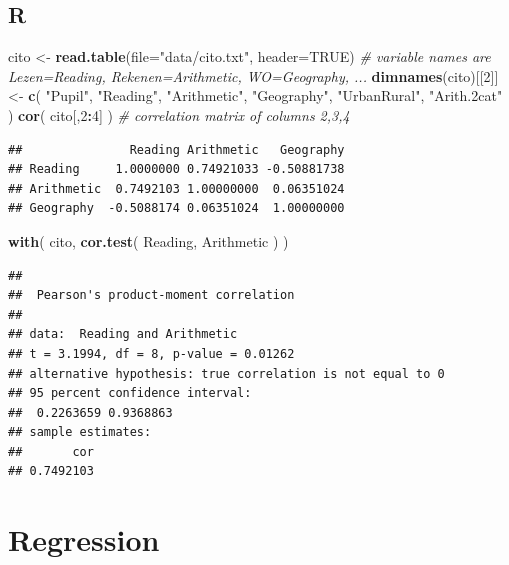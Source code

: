 \documentclass[
]{book}
\newenvironment{Shaded}{\begin{snugshade}}{\end{snugshade}}
\newcommand{\AttributeTok}[1]{\textcolor[rgb]{0.13,0.29,0.53}{#1}}
\newcommand{\CommentTok}[1]{\textcolor[rgb]{0.56,0.35,0.01}{\textit{#1}}}
\newcommand{\ConstantTok}[1]{\textcolor[rgb]{0.56,0.35,0.01}{#1}}
\newcommand{\DecValTok}[1]{\textcolor[rgb]{0.00,0.00,0.81}{#1}}
\newcommand{\FunctionTok}[1]{\textcolor[rgb]{0.13,0.29,0.53}{\textbf{#1}}}
\newcommand{\NormalTok}[1]{#1}
\newcommand{\OtherTok}[1]{\textcolor[rgb]{0.56,0.35,0.01}{#1}}
\newcommand{\SpecialCharTok}[1]{\textcolor[rgb]{0.81,0.36,0.00}{\textbf{#1}}}
\newcommand{\StringTok}[1]{\textcolor[rgb]{0.31,0.60,0.02}{#1}}
\begin{document}
\subsection{R}\label{r-7}

\begin{Shaded}
\begin{Highlighting}[]
\NormalTok{cito }\OtherTok{\textless{}{-}} \FunctionTok{read.table}\NormalTok{(}\AttributeTok{file=}\StringTok{"data/cito.txt"}\NormalTok{, }\AttributeTok{header=}\ConstantTok{TRUE}\NormalTok{)}
\CommentTok{\# variable names are Lezen=Reading, Rekenen=Arithmetic, WO=Geography, ...}
\FunctionTok{dimnames}\NormalTok{(cito)[[}\DecValTok{2}\NormalTok{]] }\OtherTok{\textless{}{-}} \FunctionTok{c}\NormalTok{( }\StringTok{"Pupil"}\NormalTok{, }\StringTok{"Reading"}\NormalTok{, }\StringTok{"Arithmetic"}\NormalTok{, }\StringTok{"Geography"}\NormalTok{,}
                          \StringTok{"UrbanRural"}\NormalTok{, }\StringTok{"Arith.2cat"}\NormalTok{ )}
\FunctionTok{cor}\NormalTok{( cito[,}\DecValTok{2}\SpecialCharTok{:}\DecValTok{4}\NormalTok{] ) }\CommentTok{\# correlation matrix of columns 2,3,4}
\end{Highlighting}
\end{Shaded}

\begin{verbatim}
##               Reading Arithmetic   Geography
## Reading     1.0000000 0.74921033 -0.50881738
## Arithmetic  0.7492103 1.00000000  0.06351024
## Geography  -0.5088174 0.06351024  1.00000000
\end{verbatim}

\begin{Shaded}
\begin{Highlighting}[]
\FunctionTok{with}\NormalTok{( cito, }\FunctionTok{cor.test}\NormalTok{( Reading, Arithmetic ) )}
\end{Highlighting}
\end{Shaded}

\begin{verbatim}
## 
##  Pearson's product-moment correlation
## 
## data:  Reading and Arithmetic
## t = 3.1994, df = 8, p-value = 0.01262
## alternative hypothesis: true correlation is not equal to 0
## 95 percent confidence interval:
##  0.2263659 0.9368863
## sample estimates:
##       cor 
## 0.7492103
\end{verbatim}

\section{Regression}\label{sec:regression}
\end{document}
